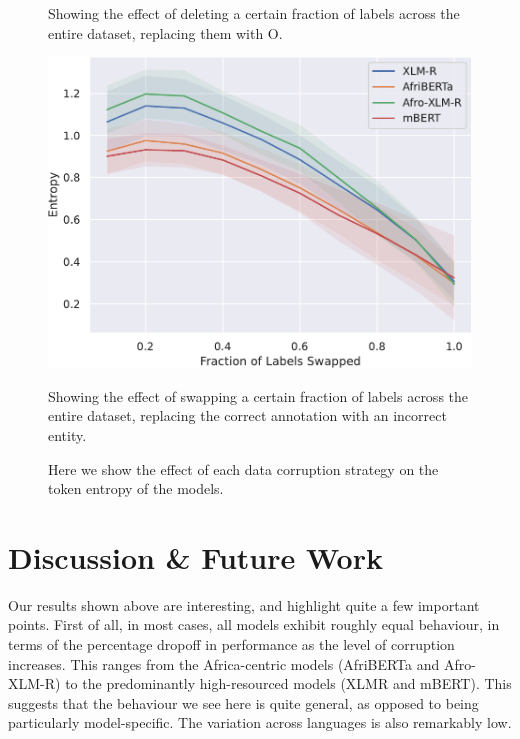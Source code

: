 \documentclass{article}
\newcommand{\afriberta}{AfriBERTa\xspace}
\newcommand{\afroxlmr}{Afro-XLM-R\xspace}
\begin{document}
\begin{figure}
\begin{minipage}[t]{0.33\linewidth}
        \caption{Showing the effect of deleting a certain fraction of labels across the entire dataset, replacing them with O.}
        \label{fig:entropy:global_cap_labels}
    \end{minipage}
    \begin{minipage}[t]{0.33\linewidth}
        \captionsetup{width=.8\linewidth}
        \centering
        \includegraphics[width=1\linewidth]{images/ALL_global_swap_labels.pdf}
        \caption{Showing the effect of swapping a certain fraction of labels across the entire dataset, replacing the correct annotation with an incorrect entity.}
        \label{fig:entropy:global_swap_labels}
    \end{minipage}
    \caption*{Here we show the effect of each data corruption strategy on the token entropy of the models.}
\end{figure}




\section{Discussion \& Future Work}
Our results shown above are interesting, and highlight quite a few important points. First of all, in most cases, all models exhibit roughly equal behaviour, in terms of the percentage dropoff in performance as the level of corruption increases. This ranges from the Africa-centric models (\afriberta and \afroxlmr) to the predominantly high-resourced models (XLMR and mBERT). This suggests that the behaviour we see here is quite general, as opposed to being particularly model-specific. The variation across languages is also remarkably low.
\end{document}
